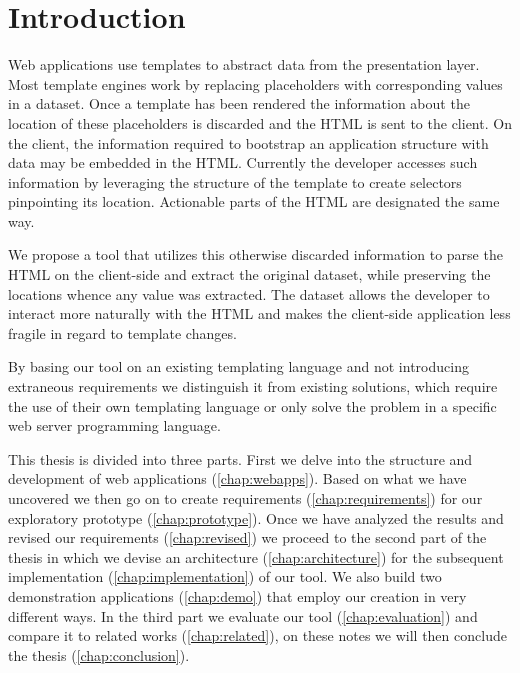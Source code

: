 \documentclass[thesis.tex]{subfiles}
\begin{document}
\chapter{Introduction}
\label{chap:intro}
Web applications use templates to abstract data from the presentation layer.
Most template engines work by replacing placeholders with corresponding values
in a dataset.
Once a template has been rendered the information about the location of these
placeholders is discarded and the HTML is sent to the client.
On the client, the information required to bootstrap an application structure
with data may be embedded in the HTML. Currently the developer accesses such
information by leveraging the structure of the template to create selectors
pinpointing its location. Actionable parts of the HTML are designated the same
way.

We propose a tool that utilizes this otherwise discarded information to parse
the HTML on the client-side and extract the original dataset, while preserving
the locations whence any value was extracted. The dataset allows the developer
to interact more naturally with the HTML and makes the client-side application
less fragile in regard to template changes.

By basing our tool on an existing templating language and not introducing
extraneous requirements we distinguish it from existing solutions,
which require the use of their own templating language or only solve the problem
in a specific web server programming language.


This thesis is divided into three parts. First we delve into the structure
and development of web applications (\ref{chap:webapps}). Based on what we have
uncovered we then go on to create requirements (\ref{chap:requirements}) for our
exploratory prototype (\ref{chap:prototype}).
Once we have analyzed the results and revised our requirements
(\ref{chap:revised}) we proceed to the second part of the thesis in which we
devise an architecture (\ref{chap:architecture}) for the subsequent
implementation (\ref{chap:implementation}) of our tool. We also build two
demonstration applications (\ref{chap:demo}) that employ our creation in very
different ways.
In the third part we evaluate our tool (\ref{chap:evaluation}) and
compare it to related works (\ref{chap:related}), on these notes we will then
conclude the thesis (\ref{chap:conclusion}).


\end{document}
